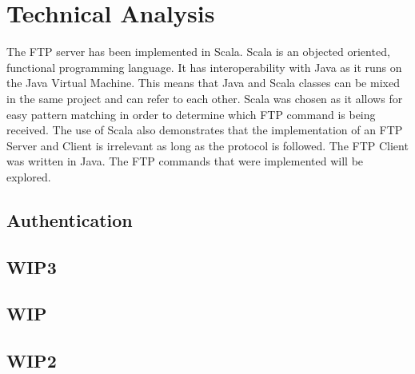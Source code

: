 \chapter{Technical Analysis}
The FTP server has been implemented in Scala. Scala is an objected oriented, functional programming language. It has interoperability with Java as it runs on the Java Virtual Machine.
This means that Java and Scala classes can be mixed in the same project and can refer to each other. Scala was chosen as it allows for easy pattern matching in order to determine
which FTP command is being received. The use of Scala also demonstrates that the implementation of an FTP Server and Client is irrelevant as long as the protocol is followed.
The FTP Client was written in Java. The FTP commands that were implemented will be explored.

\section{Authentication}



\section{WIP3}


\section{WIP}

\section{WIP2}
